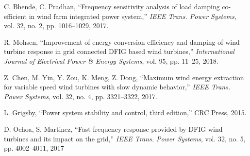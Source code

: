 \documentclass[journal]{IEEEtran}
\begin{document}
\begin{thebibliography}{99}
C. Bhende, C. Pradhan, ``Frequency sensitivity analysis of  load damping co-efficient in wind farm integrated power system,” \emph{IEEE Trans. Power Systems}, vol. 32, no. 2, pp. 1016–1029, 2017.

R. Mohsen, “Improvement of energy conversion efficiency and damping of wind turbine response in grid connected DFIG based wind turbines,” \emph{International Journal of Electrical Power \& Energy Systems}, vol. 95, pp. 11–25, 2018.

Z. Chen, M. Yin, Y. Zou, K. Meng, Z. Dong, ``Maximum wind energy  extraction for variable speed wind turbines with slow dynamic behavior,” \emph{IEEE Trans. Power Systems}, vol. 32,  no. 4,  pp. 3321–3322, 2017.

L. Grigsby, ``Power system stability and control, third  edition,” CRC Press, 2015.

D. Ochoa, S. Martinez, ``Fast-frequency response provided by DFIG wind turbines and its impact on the grid,” \emph{IEEE Trans. Power Systems}, vol. 32, no. 5, pp. 4002–4011, 2017

\end{thebibliography}
\end{document}
